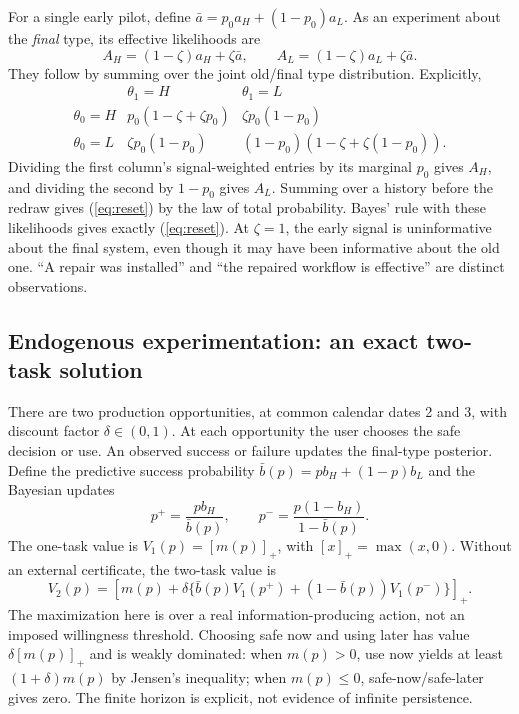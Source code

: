For a single early pilot, define $\bar a=p_0a_H+(1-p_0)a_L$. As an experiment about the \emph{final} type, its effective likelihoods are
\begin{equation}
 A_H=(1-\zeta)a_H+\zeta\bar a,\qquad
 A_L=(1-\zeta)a_L+\zeta\bar a.\label{eq:effective}
\end{equation}
They follow by summing over the joint old/final type distribution. Explicitly,
\[
\begin{array}{c|cc}
 &\theta_1=H&\theta_1=L\\\hline
\theta_0=H&p_0(1-\zeta+\zeta p_0)&\zeta p_0(1-p_0)\\
\theta_0=L&\zeta p_0(1-p_0)&(1-p_0)(1-\zeta+\zeta(1-p_0)).
\end{array}
\]
Dividing the first column's signal-weighted entries by its marginal $p_0$ gives $A_H$, and dividing the second by $1-p_0$ gives $A_L$. Summing over a history before the redraw gives (\ref{eq:reset}) by the law of total probability. Bayes' rule with these likelihoods gives exactly (\ref{eq:reset}). At $\zeta=1$, the early signal is uninformative about the final system, even though it may have been informative about the old one. ``A repair was installed'' and ``the repaired workflow is effective'' are distinct observations.

\subsection{Endogenous experimentation: an exact two-task solution}\label{sec:bellman}
There are two production opportunities, at common calendar dates 2 and 3, with discount factor $\delta\in(0,1)$. At each opportunity the user chooses the safe decision or use. An observed success or failure updates the final-type posterior. Define the predictive success probability $\bar b(p)=pb_H+(1-p)b_L$ and the Bayesian updates
\begin{equation}
 p^+=\frac{pb_H}{\bar b(p)},\qquad
 p^-=\frac{p(1-b_H)}{1-\bar b(p)}.\label{eq:bayes}
\end{equation}
The one-task value is $V_1(p)=[m(p)]_+$, with $[x]_+=\max(x,0)$. Without an external certificate, the two-task value is
\begin{equation}
 V_2(p)=\left[m(p)+\delta\{\bar b(p)V_1(p^+)+(1-\bar b(p))V_1(p^-)\}\right]_+.\label{eq:v2}
\end{equation}
The maximization here is over a real information-producing action, not an imposed willingness threshold. Choosing safe now and using later has value $\delta[m(p)]_+$ and is weakly dominated: when $m(p)>0$, use now yields at least $(1+\delta)m(p)$ by Jensen's inequality; when $m(p)\leq0$, safe-now/safe-later gives zero. The finite horizon is explicit, not evidence of infinite persistence.

